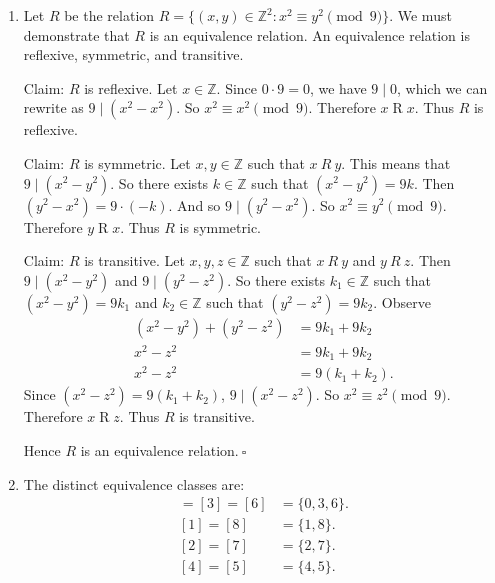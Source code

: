 \documentclass{article}
\newcommand{\Z}{\mathbb{Z}}
\theoremstyle{definition}
\begin{document}
\begin{solution}
\begin{enumerate}
\item
Let $R$ be the relation $R=\{(x,y)\in\Z^2:x^2\equiv y^2\pmod{9}\}$. We must demonstrate that $R$ is an equivalence relation. An equivalence relation is reflexive, symmetric, and transitive.
\newline

\noindent Claim: $R$ is reflexive. Let $x\in\Z$. Since $0\cdot 9=0$, we have $9\mid 0$, which we can rewrite as $9\mid(x^2-x^2)$. So $x^2\equiv x^2\pmod{9}$. Therefore $x\mathrel{R}x$. Thus $R$ is reflexive.
\newline

\noindent Claim: $R$ is symmetric. Let $x,y\in\Z$ such that $x~R~y$. This means that $9\mid(x^2-y^2)$. So there exists $k\in\Z$ such that $(x^2-y^2)=9k$. Then $(y^2-x^2)=9\cdot(-k)$. And so $9\mid(y^2-x^2)$. So $x^2\equiv y^2\pmod{9}$. Therefore $y\mathrel{R}x$. Thus $R$ is symmetric. 
\newline

\noindent Claim: $R$ is transitive. Let $x,y,z\in\Z$ such that $x~R~y$ and $y~R~z$. Then $9\mid(x^2-y^2)$ and $9\mid(y^2-z^2)$. So there exists $k_1\in\Z$ such that $(x^2-y^2)=9k_1$ and $k_2\in\Z$ such that $(y^2-z^2)=9k_2$. Observe
\begin{align*}
(x^2-y^2)+(y^2-z^2)&=9k_1+9k_2\\
x^2-z^2&=9k_1+9k_2\\
x^2-z^2&=9(k_1+k_2).
\end{align*}
Since $(x^2-z^2)=9(k_1+k_2)$, $9\mid(x^2-z^2)$. So $x^2\equiv z^2\pmod{9}$. Therefore $x\mathrel{R}z$. Thus $R$ is transitive.
\newline

\noindent Hence $R$ is an equivalence relation.$~\square$
\item The distinct equivalence classes are:
\begin{align*}
[0]=[3]=[6]&=\{0,3,6\}.\\
[1]=[8]&=\{1,8\}.\\
[2]=[7]&=\{2,7\}.\\
[4]=[5]&=\{4,5\}.
\end{align*}
\end{enumerate}
\end{solution}
\end{document}
